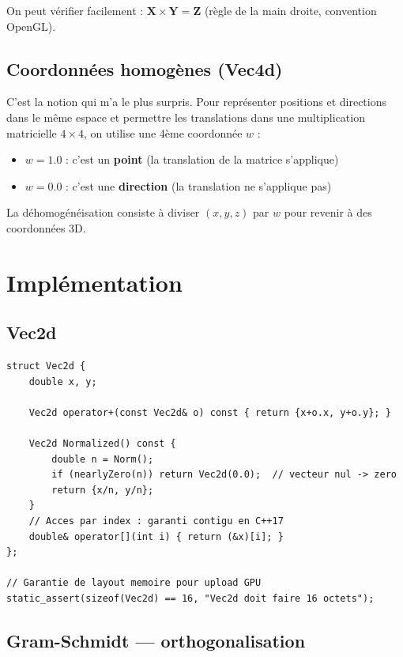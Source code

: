 \documentclass[12pt,a4paper]{report}
\begin{document}
On peut vérifier facilement : $\mathbf{X} \times \mathbf{Y} = \mathbf{Z}$ (règle de la main droite, convention OpenGL).

\subsection{Coordonnées homogènes (Vec4d)}

C'est la notion qui m'a le plus surpris. Pour représenter positions et directions dans le même espace et permettre les translations dans une multiplication matricielle $4\times4$, on utilise une 4ème coordonnée $w$ :

\begin{itemize}
    \item $w = 1.0$ : c'est un \textbf{point} (la translation de la matrice s'applique)
    \item $w = 0.0$ : c'est une \textbf{direction} (la translation ne s'applique pas)
\end{itemize}

La déhomogénéisation consiste à diviser $(x, y, z)$ par $w$ pour revenir à des coordonnées 3D.

\section{Implémentation}

\subsection{Vec2d}

\begin{lstlisting}[caption={Extrait de Vec2d — layout mémoire garanti}]
struct Vec2d {
    double x, y;

    Vec2d operator+(const Vec2d& o) const { return {x+o.x, y+o.y}; }
    
    Vec2d Normalized() const {
        double n = Norm();
        if (nearlyZero(n)) return Vec2d(0.0);  // vecteur nul -> zero
        return {x/n, y/n};
    }
    // Acces par index : garanti contigu en C++17
    double& operator[](int i) { return (&x)[i]; }
};

// Garantie de layout memoire pour upload GPU
static_assert(sizeof(Vec2d) == 16, "Vec2d doit faire 16 octets");
\end{lstlisting}

\subsection{Gram-Schmidt — orthogonalisation}
\end{document}
